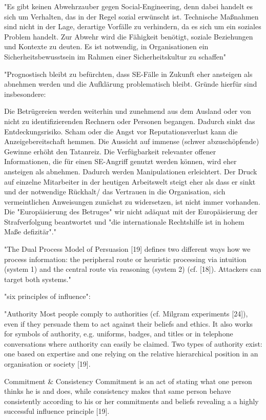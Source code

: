 "Es gibt keinen Abwehrzauber gegen Social-Engineering, denn dabei handelt es sich um Verhalten,
das in der Regel sozial erwünscht ist. Technische
Maßnahmen sind nicht in der Lage, derartige Vorfälle zu verhindern, da es
sich um ein soziales Problem handelt. Zur Abwehr wird die Fähigkeit benötigt,
soziale Beziehungen und Kontexte zu deuten. Es ist notwendig, in Organisationen
ein Sicherheitsbewusstsein im Rahmen einer Sicherheitskultur zu schaffen"\cite{10_bka}

"Prognostisch bleibt zu befürchten, dass SE-Fälle in Zukunft eher ansteigen als abnehmen
werden und die Aufklärung problematisch bleibt. Gründe hierfür sind insbesondere:

 Die Betrügereien werden weiterhin und zunehmend aus dem Ausland oder von nicht
zu identifizierenden Rechnern oder Personen begangen. Dadurch sinkt das Entdeckungsrisiko.
 Scham oder die Angst vor Reputationsverlust kann die Anzeigebereitschaft hemmen.
 Die Aussicht auf immense (schwer abzuschöpfende) Gewinne erhöht den Tatanreiz.
 Die Verfügbarkeit relevanter offener Informationen, die für einen SE-Angriff genutzt
werden können, wird eher ansteigen als abnehmen. Dadurch werden Manipulationen
erleichtert.
 Der Druck auf einzelne Mitarbeiter in der heutigen Arbeitswelt steigt eher als dass er
sinkt und der notwendige Rückhalt/ das Vertrauen in die Organisation, sich vermeintlichen Anweisungen zunächst zu widersetzen, ist nicht immer vorhanden.
 Die "Europäisierung des Betruges" wir nicht adäquat mit der Europäisierung der
Strafverfolgung beantwortet und "die internationale Rechtshilfe ist in hohem Maße defizitär"."\cite{10_bka}

"The Dual Process Model of Persuasion [19] defines two different ways how we process information: the peripheral route or heuristic processing via intuition
(system 1) and the central route via reasoning (system 2) (cf. [18]). Attackers can target both systems."\cite{7_mdpi}

"six principles of influence":\cite{7_mdpi}

"Authority
Most people comply to authorities (cf. Milgram experiments [24]), even if they persuade them to act against their beliefs and ethics. It also works for symbols of authority, e.g. uniforms, badges, and titles or in telephone conversations where authority can easily be claimed. Two types of authority exist: one based on expertise and one relying on the relative hierarchical position in an organisation or society [19].

Commitment \& Consistency
Commitment is an act of stating what one person thinks he is and does, while consistency makes that same person behave consistently according to his or her commitments and beliefs revealing a a highly successful influence principle [19].

